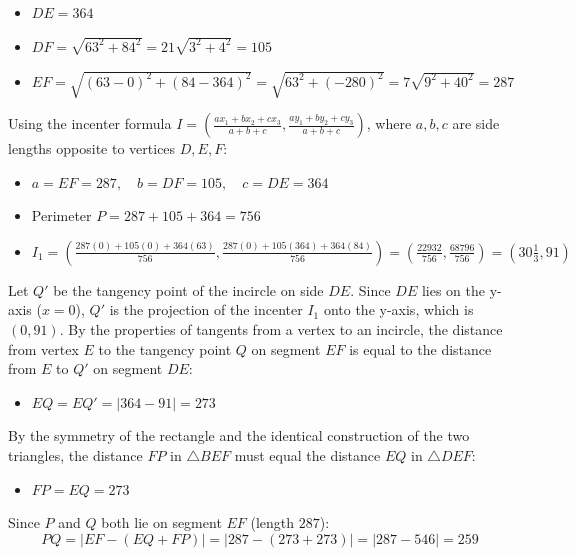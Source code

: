 \begin{enumerate}
 
            \begin{itemize}
        \item $DE = 364$
        \item $DF = \sqrt{63^2 + 84^2} = 21\sqrt{3^2 + 4^2} = 105$
        \item $EF = \sqrt{(63-0)^2 + (84-364)^2} = \sqrt{63^2 + (-280)^2} = 7\sqrt{9^2 + 40^2} = 287$
            \end{itemize}
            Using the incenter formula $I = \left( \frac{ax_1 + bx_2 + cx_3}{a+b+c}, \frac{ay_1 + by_2 + cy_3}{a+b+c} \right)$, where $a, b, c$ are side lengths opposite to vertices $D, E, F$:

 
            \begin{itemize}
        \item $a = EF = 287, \quad b = DF = 105, \quad c = DE = 364$
        \item Perimeter $P = 287 + 105 + 364 = 756$
        \item $I_1 = \left( \frac{287(0) + 105(0) + 364(63)}{756}, \frac{287(0) + 105(364) + 364(84)}{756} \right) = \left( \frac{22932}{756}, \frac{68796}{756} \right) = (30\frac{1}{3}, 91)$
            \end{itemize}
            Let $Q'$ be the tangency point of the incircle on side $DE$. Since $DE$ lies on the y-axis ($x=0$), $Q'$ is the projection of the incenter $I_1$ onto the y-axis, which is $(0, 91)$. By the properties of tangents from a vertex to an incircle, the distance from vertex $E$ to the tangency point $Q$ on segment $EF$ is equal to the distance from $E$ to $Q'$ on segment $DE$:

 
            \begin{itemize}
        \item $EQ = EQ' = |364 - 91| = 273$
            \end{itemize}
            By the symmetry of the rectangle and the identical construction of the two triangles, the distance $FP$ in $\triangle BEF$ must equal the distance $EQ$ in $\triangle DEF$:

 
            \begin{itemize}
        \item $FP = EQ = 273$
            \end{itemize}
            Since $P$ and $Q$ both lie on segment $EF$ (length $287$):
 \[PQ = |EF - (EQ + FP)| = |287 - (273 + 273)| = |287 - 546| = \boxed{259}\]




\end{enumerate}
